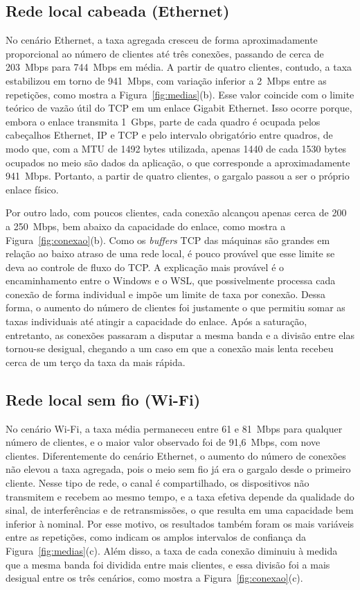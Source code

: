 \documentclass[12pt]{article}
\begin{document}
\newpage

\subsection{Rede local cabeada (Ethernet)}

No cenário Ethernet, a taxa agregada cresceu de forma aproximadamente proporcional
ao número de clientes até três conexões, passando de cerca de 203~Mbps para
744~Mbps em média. A partir de quatro clientes, contudo, a taxa estabilizou em
torno de 941~Mbps, com variação inferior a 2~Mbps entre as repetições, como
mostra a Figura~\ref{fig:medias}(b). Esse valor coincide com o limite teórico de
vazão útil do TCP em um enlace Gigabit Ethernet. Isso ocorre porque, embora o
enlace transmita 1~Gbps, parte de cada quadro é ocupada pelos cabeçalhos
Ethernet, IP e TCP e pelo intervalo obrigatório entre quadros, de modo que, com
a MTU de 1492 bytes utilizada, apenas 1440 de cada 1530 bytes ocupados no meio
são dados da aplicação, o que corresponde a aproximadamente 941~Mbps.
Portanto, a partir de quatro clientes, o gargalo passou a ser o próprio enlace
físico.

Por outro lado, com poucos clientes, cada conexão alcançou apenas cerca de 200
a 250~Mbps, bem abaixo da capacidade do enlace, como mostra a
Figura~\ref{fig:conexao}(b). Como os \textit{buffers} TCP
das máquinas são grandes em relação ao baixo atraso de uma rede local, é pouco
provável que esse limite se deva ao controle de fluxo do TCP. A explicação mais
provável é o encaminhamento entre o Windows e o WSL, que possivelmente processa
cada conexão de forma individual e impõe um limite de taxa por conexão. Dessa
forma, o aumento do número de clientes foi justamente o que permitiu somar as
taxas individuais até atingir a capacidade do enlace. Após a saturação,
entretanto, as conexões passaram a disputar a mesma banda e a divisão entre
elas tornou-se desigual, chegando a um caso em que a conexão mais lenta recebeu
cerca de um terço da taxa da mais rápida.

\subsection{Rede local sem fio (Wi-Fi)}

No cenário Wi-Fi, a taxa média permaneceu entre 61 e 81~Mbps para qualquer
número de clientes, e o maior valor observado foi de 91,6~Mbps, com nove
clientes. Diferentemente do cenário Ethernet, o aumento do número de conexões não
elevou a taxa agregada, pois o meio sem fio já era o gargalo desde o primeiro
cliente. Nesse tipo de rede, o canal é compartilhado, os dispositivos não
transmitem e recebem ao mesmo tempo, e a taxa efetiva depende da qualidade do
sinal, de interferências e de retransmissões, o que resulta em uma capacidade
bem inferior à nominal. Por esse motivo, os resultados também foram os mais
variáveis entre as repetições, como indicam os amplos intervalos de confiança
da Figura~\ref{fig:medias}(c). Além disso, a taxa de cada conexão diminuiu à
medida que a mesma banda foi dividida entre mais clientes, e essa divisão foi a
mais desigual entre os três cenários, como mostra a
Figura~\ref{fig:conexao}(c).
\end{document}
